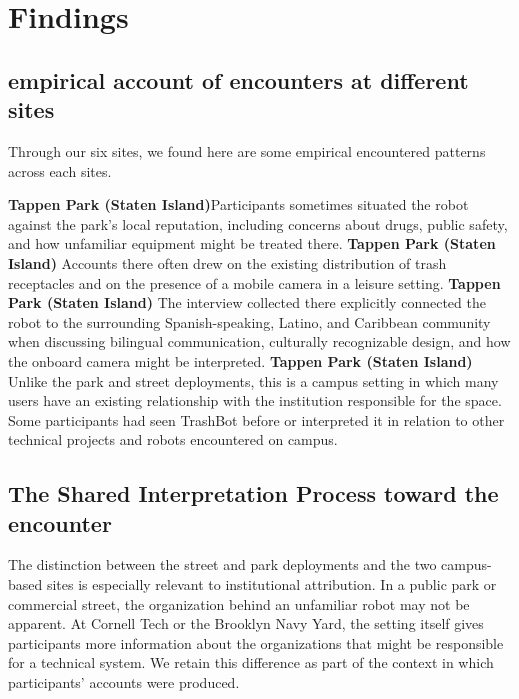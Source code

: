 
\section{Findings}
\label{sec:findings}
\subsection{empirical account of encounters at different sites}
Through our six sites, we found here are some empirical encountered patterns across each sites.

\textbf{Tappen Park (Staten Island)}Participants sometimes situated the robot against
the park’s local reputation, including concerns about drugs, public
safety, and how unfamiliar equipment might be treated there.
\textbf{Tappen Park (Staten Island)} Accounts there often drew on the existing distribution of trash receptacles and on
the presence of a mobile camera in a leisure setting. 
\textbf{Tappen Park (Staten Island)} The interview collected there explicitly connected the robot to the
surrounding Spanish-speaking, Latino, and Caribbean community
when discussing bilingual communication, culturally recognizable
design, and how the onboard camera might be interpreted.
\textbf{Tappen Park (Staten Island)} Unlike the park and street deployments,
this is a campus setting in which many users have an existing
relationship with the institution responsible for the space. Some
participants had seen TrashBot before or interpreted it in relation
to other technical projects and robots encountered on campus.
\subsection{The Shared Interpretation Process toward the encounter}
\label{sec:shared-move}

The distinction between the street and park deployments and the two campus-based sites is especially relevant to institutional attribution. In a public park or commercial street, the organization behind an unfamiliar robot may not be apparent. At Cornell Tech or the Brooklyn Navy Yard, the setting itself gives participants more information about the organizations that might be responsible for a technical system. We retain this difference as part of the context in which participants' accounts were produced.

